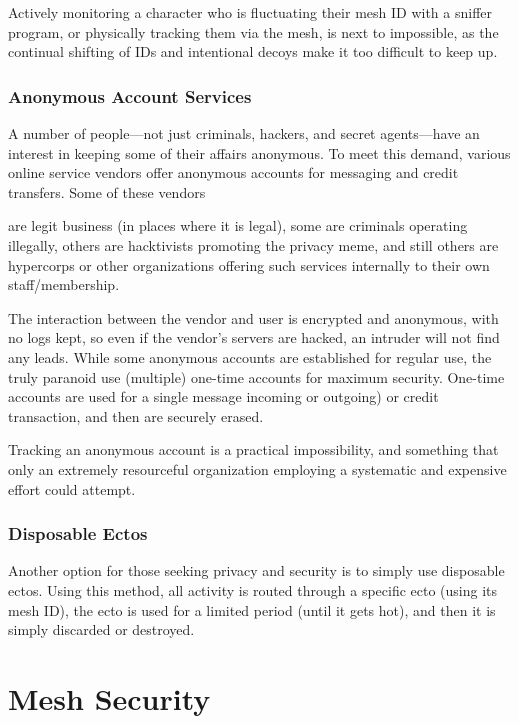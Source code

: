 Actively monitoring a character who is fluctuating their mesh ID with a sniffer program, or physically tracking them via the mesh, is next to impossible, as the continual shifting of IDs and intentional decoys make it too difficult to keep up. 

\subsubsection{Anonymous Account Services} 

A number of people—not just criminals, hackers, and secret agents—have an interest in keeping some of their affairs anonymous. To meet this demand, various online service vendors offer anonymous accounts for messaging and credit transfers. Some of these vendors 

are legit business (in places where it is legal), some are criminals operating illegally, others are hacktivists promoting the privacy meme, and still others are hypercorps or other organizations offering such services internally to their own staff/membership. 

The interaction between the vendor and user is encrypted and anonymous, with no logs kept, so even if the vendor's servers are hacked, an intruder will not find any leads. While some anonymous accounts are established for regular use, the truly paranoid use (multiple) one-time accounts for maximum security. One-time accounts are used for a single message incoming or outgoing) or credit transaction, and then are securely erased. 

Tracking an anonymous account is a practical impossibility, and something that only an extremely resourceful organization employing a systematic and expensive effort could attempt. 

\subsubsection{Disposable Ectos} 

Another option for those seeking privacy and security is to simply use disposable ectos. Using this method, all activity is routed through a specific ecto (using its mesh ID), the ecto is used for a limited period (until it gets hot), and then it is simply discarded or destroyed. 

\section{Mesh Security} 

